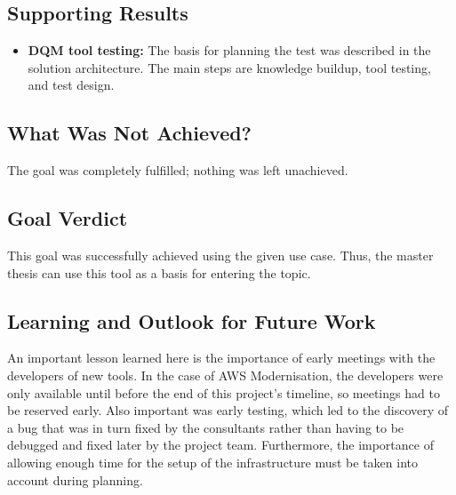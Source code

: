 \subsection*{Supporting Results}

\begin{itemize}
\item \textbf{DQM tool testing:} The basis for planning the test was described in the solution architecture. The main steps are knowledge buildup, tool testing, and test design.
\end{itemize}

\subsection*{What Was Not Achieved?}

The goal was completely fulfilled; nothing was left unachieved.

\subsection*{Goal Verdict}

This goal was successfully achieved using the given use case. Thus, the master thesis can use this tool as a basis for entering the topic.



\subsection*{Learning and Outlook for Future Work}

An important lesson learned here is the importance of early meetings with the developers of new tools. In the case of AWS Modernisation, the developers were only available until before the end of this project's timeline, so meetings had to be reserved early. Also important was early testing, which led to the discovery of a bug that was in turn fixed by the consultants rather than having to be debugged and fixed later by the project team. Furthermore, the importance of allowing enough time for the setup of the infrastructure must be taken into account during planning.
